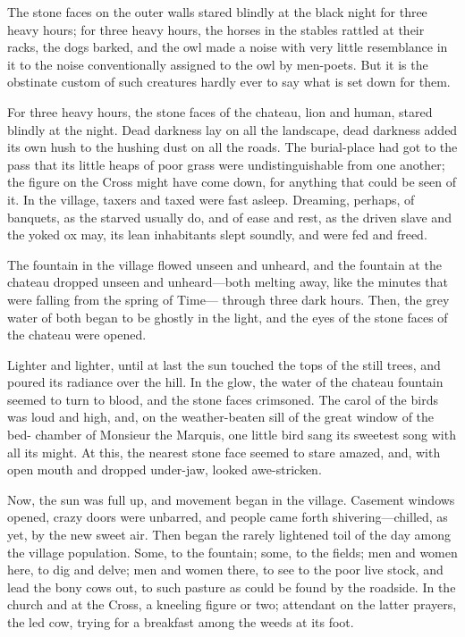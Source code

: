 The stone faces on the outer walls stared blindly at the black night
for three heavy hours; for three heavy hours, the horses in the
stables rattled at their racks, the dogs barked, and the owl made a
noise with very little resemblance in it to the noise conventionally
assigned to the owl by men-poets.  But it is the obstinate custom of
such creatures hardly ever to say what is set down for them.

For three heavy hours, the stone faces of the chateau, lion and
human, stared blindly at the night.  Dead darkness lay on all the
landscape, dead darkness added its own hush to the hushing dust on
all the roads.  The burial-place had got to the pass that its little
heaps of poor grass were undistinguishable from one another; the
figure on the Cross might have come down, for anything that could be
seen of it.  In the village, taxers and taxed were fast asleep.
Dreaming, perhaps, of banquets, as the starved usually do, and of
ease and rest, as the driven slave and the yoked ox may, its lean
inhabitants slept soundly, and were fed and freed.

The fountain in the village flowed unseen and unheard, and the
fountain at the chateau dropped unseen and unheard---both melting
away, like the minutes that were falling from the spring of Time---%
through three dark hours.  Then, the grey water of both began to be
ghostly in the light, and the eyes of the stone faces of the chateau
were opened.

Lighter and lighter, until at last the sun touched the tops of the
still trees, and poured its radiance over the hill.  In the glow,
the water of the chateau fountain seemed to turn to blood, and the
stone faces crimsoned.  The carol of the birds was loud and high,
and, on the weather-beaten sill of the great window of the bed-%
chamber of Monsieur the Marquis, one little bird sang its sweetest
song with all its might.  At this, the nearest stone face seemed
to stare amazed, and, with open mouth and dropped under-jaw, looked
awe-stricken.

Now, the sun was full up, and movement began in the village.
Casement windows opened, crazy doors were unbarred, and people came
forth shivering---chilled, as yet, by the new sweet air.  Then began
the rarely lightened toil of the day among the village population.
Some, to the fountain; some, to the fields; men and women here, to
dig and delve; men and women there, to see to the poor live stock,
and lead the bony cows out, to such pasture as could be found by the
roadside.  In the church and at the Cross, a kneeling figure or two;
attendant on the latter prayers, the led cow, trying for a breakfast
among the weeds at its foot.

